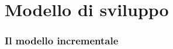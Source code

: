 \documentclass[PianoDiProgetto.tex]{subfiles}
\begin{document}
\chapter{Modello di sviluppo}
\subsection{Il modello incrementale}
\end{document}
